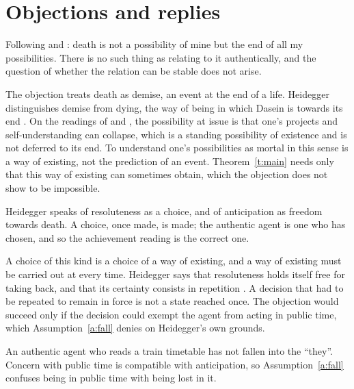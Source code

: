 \documentclass{situationist-preprint}
\begin{document}
\section{Objections and replies}\label{s:obj}

\begin{objection}
Following \citet{Edwards1975} and \citet{Sartre1943}: death is not a possibility of mine but the end of all my possibilities. There is no such thing as relating to it authentically, and the question of whether the relation can be stable does not arise.
\end{objection}

\begin{reply}
The objection treats death as demise, an event at the end of a life. Heidegger distinguishes demise from dying, the way of being in which Dasein is towards its end \citep[\S\S 49--50]{Heidegger1927}. On the readings of \citet{Haugeland2000} and \citet{Thomson2013}, the possibility at issue is that one's projects and self-understanding can collapse, which is a standing possibility of existence and is not deferred to its end. To understand one's possibilities as mortal in this sense is a way of existing, not the prediction of an event. Theorem~\ref{t:main} needs only that this way of existing can sometimes obtain, which the objection does not show to be impossible.
\end{reply}

\begin{objection}
Heidegger speaks of resoluteness as a choice, and of anticipation as freedom towards death. A choice, once made, is made; the authentic agent is one who has chosen, and so the achievement reading is the correct one.
\end{objection}

\begin{reply}
A choice of this kind is a choice of a way of existing, and a way of existing must be carried out at every time. Heidegger says that resoluteness holds itself free for taking back, and that its certainty consists in repetition \citep[\S 62]{Heidegger1927}. A decision that had to be repeated to remain in force is not a state reached once. The objection would succeed only if the decision could exempt the agent from acting in public time, which Assumption~\ref{a:fall} denies on Heidegger's own grounds.
\end{reply}

\begin{objection}
An authentic agent who reads a train timetable has not fallen into the \enquote{they}. Concern with public time is compatible with anticipation, so Assumption~\ref{a:fall} confuses being in public time with being lost in it.
\end{objection}
\end{document}
